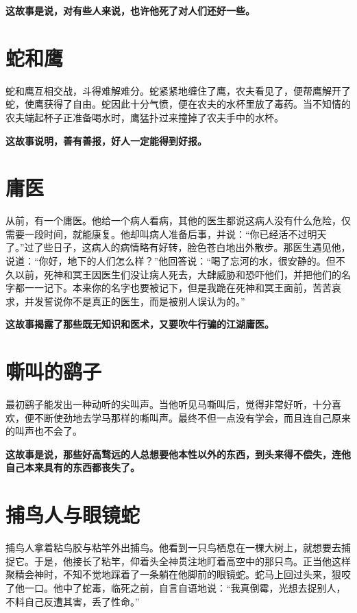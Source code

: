 {\bfseries \color{red}这故事是说，对有些人来说，也许他死了对人们还好一些。}

\section{蛇和鹰}

蛇和鹰互相交战，斗得难解难分。蛇紧紧地缠住了鹰，农夫看见了，便帮鹰解开了蛇，使鹰获得了自由。蛇因此十分气愤，便在农夫的水杯里放了毒药。当不知情的农夫端起杯子正准备喝水时，鹰猛扑过来撞掉了农夫手中的水杯。

{\bfseries \color{red}这故事说明，善有善报，好人一定能得到好报。}

\section{庸医}

从前，有一个庸医。他给一个病人看病，其他的医生都说这病人没有什么危险，仅需要一段时间，就能康复。他却叫病人准备后事，并说：“你已经活不过明天了。”过了些日子，这病人的病情略有好转，脸色苍白地出外散步。那医生遇见他，说道：“你好，地下的人们怎么样？”他回答说：“喝了忘河的水，很安静的。但不久以前，死神和冥王因医生们没让病人死去，大肆威胁和恐吓他们，并把他们的名字都一一记下。本来你的名字也要被记下，但是我跪在死神和冥王面前，苦苦哀求，并发誓说你不是真正的医生，而是被别人误认为的。”

{\bfseries \color{red}这故事揭露了那些既无知识和医术，又要吹牛行骗的江湖庸医。}

\section{嘶叫的鹞子}

最初鹞子能发出一种动听的尖叫声。当他听见马嘶叫后，觉得非常好听，十分喜欢，便不断使劲地去学马那样的嘶叫声。最终不但一点没有学会，而且连自己原来的叫声也不会了。

{\bfseries \color{red}这故事是说，那些好高骛远的人总想要他本性以外的东西，到头来得不偿失，连他自己本来具有的东西都丧失了。}

\section{捕鸟人与眼镜蛇}

捕鸟人拿着粘鸟胶与粘竿外出捕鸟。他看到一只鸟栖息在一棵大树上，就想要去捕捉它。于是，他接长了粘竿，仰着头全神贯注地盯着高空中的那只鸟。正当他这样聚精会神时，不知不觉地踩着了一条躺在他脚前的眼镜蛇。蛇马上回过头来，狠咬了他一口。他中了蛇毒，临死之前，自言自语地说：“我真倒霉，光想去捉别人，不料自己反遭其害，丢了性命。”

